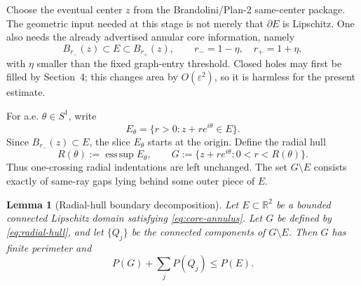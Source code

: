 \documentclass[11pt]{article}
\newtheorem{lemma}[theorem]{Lemma}
\newcommand{\R}{\mathbb R}
\begin{document}
Choose the eventual center \(z\) from the Brandolini/Plan-2 same-center
package.  The geometric input needed at this stage is not merely that
\(\partial E\) is Lipschitz.  One also needs the already advertised annular
core information, namely
\[
   B_{r_-}(z)\subset E\subset B_{r_+}(z),
   \qquad
   r_-=1-\eta,\quad r_+=1+\eta,
   \tag{5.1}\label{eq:core-annulus}
\]
with \(\eta\) smaller than the fixed graph-entry threshold.  Closed holes may
first be filled by Section~4; this changes area by \(O(\varepsilon^2)\), so
it is harmless for the present estimate.

For a.e. \(\theta\in S^1\), write
\[
   E_\theta=\{r>0:z+re^{i\theta}\in E\}.
\]
Since \(B_{r_-}(z)\subset E\), the slice \(E_\theta\) starts at the origin.
Define the radial hull
\[
   R(\theta):=\operatorname*{ess\,sup} E_\theta,
   \qquad
   G:=\{z+re^{i\theta}:0<r<R(\theta)\}.
   \tag{5.2}\label{eq:radial-hull}
\]
Thus one-crossing radial indentations are left unchanged.  The set
\(G\setminus E\) consists exactly of same-ray gaps lying behind some outer
piece of \(E\).

\begin{lemma}[Radial-hull boundary decomposition]\label{lem:hull-decomp}
Let \(E\subset\R^2\) be a bounded connected Lipschitz domain satisfying
\eqref{eq:core-annulus}.  Let \(G\) be defined by \eqref{eq:radial-hull}, and
let \(\{Q_j\}\) be the connected components of \(G\setminus E\).  Then \(G\)
has finite perimeter and
\[
   P(G)+\sum_j P(Q_j)\le P(E).
   \tag{5.3}\label{eq:decomposition}
\]
\end{lemma}
\end{document}
